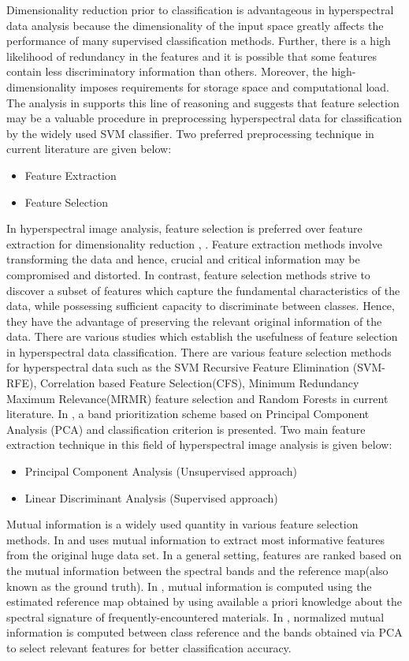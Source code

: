 \documentclass[document.tex]{subfiles}
\begin{document}
Dimensionality reduction prior to classification is advantageous in hyperspectral data
analysis because the dimensionality of the input space greatly affects the performance of
many supervised classification methods\cite{13}. Further, there is a high likelihood of redundancy in the features and it is possible that some features contain less discriminatory
information than others. Moreover, the high-dimensionality imposes requirements for
storage space and computational load. The analysis in \cite{1} supports this line of reasoning
and suggests that feature selection may be a valuable procedure in preprocessing hyperspectral data for classification by the widely used SVM classifier. Two preferred preprocessing technique in current literature are given below:
\begin{itemize}
	\item Feature Extraction
	\item Feature Selection
\end{itemize}
\noindent In hyperspectral
image analysis, feature selection is preferred over feature extraction for dimensionality
reduction \cite{4}, \cite{13}. Feature extraction methods involve transforming the data and hence,
crucial and critical information may be compromised and distorted. In contrast, feature
selection methods strive to discover a subset of features which capture the fundamental
characteristics of the data, while possessing sufficient capacity to discriminate between
classes. Hence, they have the advantage of preserving the relevant original information of
the data. There are various studies which establish the usefulness of feature selection in
hyperspectral data classification. There are various feature selection methods for hyperspectral data such as the SVM Recursive Feature Elimination (SVM-RFE), Correlation
based Feature Selection(CFS), Minimum Redundancy Maximum Relevance(MRMR)
\cite{14} feature selection and Random Forests\cite{15} in current literature. In \cite{5}, a band prioritization scheme based
on Principal Component Analysis (PCA) and classification criterion is presented. Two main feature extraction technique in this field of hyperspectral image analysis is given below:
\begin{itemize}
	\item Principal Component Analysis (Unsupervised approach)
	\item Linear Discriminant Analysis (Supervised approach)
\end{itemize}

\noindent Mutual
information is a widely used quantity in various feature selection methods. In \cite{16} and \cite{17} uses mutual information to extract most informative features from the original huge data set. In a general
setting, features are ranked based on the mutual information between the spectral bands
and the reference map(also known as the ground truth). In \cite{10}, mutual information is
computed using the estimated reference map obtained by using available a priori knowledge about the spectral signature of frequently-encountered materials. In \cite{9}, normalized mutual information is computed between class reference and the bands obtained via PCA to select relevant features for better classification accuracy.  
\end{document}
